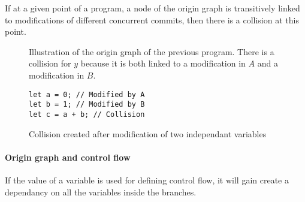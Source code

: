 \documentclass[a4paper,10pt]{article}
\begin{document}
If at a given point of a program, a node of the origin graph is transitively linked to modifications of different concurrent commits, then there is a collision at this point.

\begin{figure}[ht]
\centering{}
\caption{Illustration of the origin graph of the previous program. There is a collision for $y$ because it is both linked to a modification in $A$ and a modification in $B$.}
\end{figure}

\begin{figure}[ht]
\begin{minipage}{.5\textwidth}
\begin{lstlisting}
let a = 0; // Modified by A
let b = 1; // Modified by B
let c = a + b; // Collision
\end{lstlisting}
\end{minipage}\hfill
\begin{minipage}{.45\textwidth}
\centering{}
\end{minipage}
\caption{Collision created after modification of two independant variables}
\end{figure}

\paragraph{Origin graph and control flow} If the value of a variable is used for defining control flow, it will gain create a dependancy on all the variables inside the branches.
\end{document}
